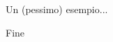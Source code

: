 \documentclass[handout, xcolor=dvipsnames,aspectratio=169]{beamer}
\begin{document}
\begin{frame}{Un (pessimo) esempio...}
    \pause

  \begin{figure}%
    \centering
  \pause
    \qquad
  \end{figure}

\end{frame}
\begin{frame}{Fine}

\end{frame}
\end{document}
